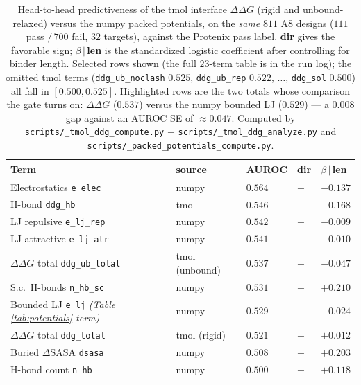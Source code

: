 \documentclass[11pt]{article}
\newcommand{\ttk}[1]{\texttt{\small #1}}
\begin{document}
\begin{table}[htbp]
\centering
{\renewcommand{\arraystretch}{1.2}%
\begin{tabular}{@{}>{\raggedright\arraybackslash}p{4.6cm}
                    >{\centering\arraybackslash}p{2.0cm}
                    >{\centering\arraybackslash}p{1.4cm}
                    >{\centering\arraybackslash}p{1.2cm}
                    >{\centering\arraybackslash}p{2.2cm}@{}}
\toprule
\textbf{Term} & \textbf{source} & \textbf{AUROC} & \textbf{dir} & \textbf{$\beta\,|\,$len}\\
\midrule
Electrostatics \ttk{e\_elec}          & numpy       & $0.564$ & $-$ & $-0.137$\\
H-bond \ttk{ddg\_hb}                   & tmol        & $0.546$ & $-$ & $-0.168$\\
LJ repulsive \ttk{e\_lj\_rep}         & numpy       & $0.542$ & $-$ & $-0.009$\\
LJ attractive \ttk{e\_lj\_atr}       & numpy       & $0.541$ & $+$ & $-0.010$\\
\rowcolor{aTint}$\Delta\Delta G$ total \ttk{ddg\_ub\_total} & tmol (unbound) & $0.537$ & $+$ & $-0.047$\\
S.c.\ H-bonds \ttk{n\_hb\_sc}         & numpy       & $0.531$ & $+$ & $+0.210$\\
\rowcolor{aTint}Bounded LJ \ttk{e\_lj}\emph{ (Table \ref{tab:potentials} term)} & numpy & $0.529$ & $-$ & $-0.024$\\
$\Delta\Delta G$ total \ttk{ddg\_total} & tmol (rigid) & $0.521$ & $-$ & $+0.012$\\
Buried $\Delta$SASA \ttk{dsasa}       & numpy       & $0.508$ & $+$ & $+0.203$\\
H-bond count \ttk{n\_hb}              & numpy       & $0.500$ & $-$ & $+0.118$\\
\bottomrule
\end{tabular}}
\caption{Head-to-head predictiveness of the tmol interface $\Delta\Delta G$ (rigid and
unbound-relaxed) versus the numpy packed potentials, on the \emph{same} $811$ A8 designs ($111$ pass
$/\,700$ fail, $32$ targets), against the Protenix pass label. \textbf{dir} gives the favorable sign;
\textbf{$\beta\,|\,$len} is the standardized logistic coefficient after controlling for binder length.
Selected rows shown (the full $23$-term table is in the run log); the omitted tmol terms
(\ttk{ddg\_ub\_noclash} $0.525$, \ttk{ddg\_ub\_rep} $0.522$, $\ldots$, \ttk{ddg\_sol} $0.500$) all
fall in $[0.500,0.525]$. Highlighted rows are the two totals whose comparison the gate turns on:
$\Delta\Delta G$ ($0.537$) versus the numpy bounded LJ ($0.529$) --- a $0.008$ gap against an AUROC
SE of $\approx\!0.047$. Computed by \ttk{scripts/\_tmol\_ddg\_compute.py} $+$
\ttk{scripts/\_tmol\_ddg\_analyze.py} and \ttk{scripts/\_packed\_potentials\_compute.py}.}
\label{tab:ddg}
\end{table}
\end{document}
